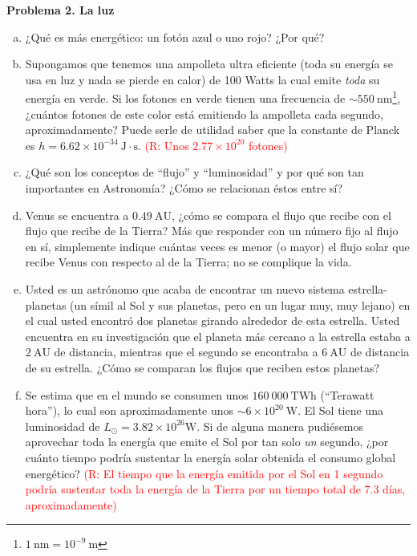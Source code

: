 \documentclass{article}
\begin{document}
\textbf{Problema 2. La luz}

\begin{enumerate} [a)]

\item ¿Qué es más energético: un fotón azul o uno rojo? ¿Por qué?

\item Supongamos que tenemos una ampolleta ultra eficiente (toda su energía se usa en luz y nada se pierde en calor) de 100 Watts la cual emite \emph{toda} su energía en verde. Si los fotones en verde tienen una frecuencia de $\sim 550 \ \text{nm}$\footnote{$1 \ \text{nm} = 10^{-9} \ \text{m}$}, ¿cuántos fotones de este color está emitiendo la ampolleta cada segundo, aproximadamente? Puede serle de utilidad saber que la constante de Planck es $h = 6.62 \times 10^{-34} \ \text{J} \cdot \text{s}$. 
\textcolor{red}{(R: Unos $2.77 \times 10^{20}$ fotones)}

\item ¿Qué son los conceptos de ``flujo'' y ``luminosidad'' y por qué son tan importantes en Astronomía? ¿Cómo se relacionan éstos entre sí?

\item Venus se encuentra a $0.49 \ \text{AU}$, ¿cómo se compara el flujo que recibe con el flujo que recibe de la Tierra? Más que responder con un número fijo al flujo en sí, simplemente indique cuántas veces es menor (o mayor) el flujo solar que recibe Venus con respecto al de la Tierra; no se complique la vida.

\newpage

\item Usted es un astrónomo que acaba de encontrar un nuevo sistema estrella-planetas (un símil al Sol y sus planetas, pero en un lugar muy, muy lejano) en el cual usted encontró dos planetas girando alrededor de esta estrella. Usted encuentra en su investigación que el planeta más cercano a la estrella estaba a $2 \ \text{AU}$ de distancia, mientras que el segundo se encontraba a $6 \ \text{AU}$ de distancia de su estrella. ¿Cómo se comparan los flujos que reciben estos planetas?

\item Se estima que en el mundo se consumen unos $160 \ 000 \ \text{TWh}$ (``Terawatt hora''), lo cual son aproximadamente unos $\sim 6 \times 10^{20} \ \text{W}$. El Sol tiene una luminosidad de $L_\odot = 3.82 \times 10^{26} \text{W}$. Si de alguna manera pudiésemos aprovechar toda la energía que emite el Sol por tan solo \emph{un} segundo, ¿por cuánto tiempo podría sustentar la energía solar obtenida el consumo global energético? \textcolor{red}{(R: El tiempo que la energía emitida por el Sol en 1 segundo podría sustentar toda la energía de la Tierra por un tiempo total de 7.3 días, aproximadamente)}
\end{enumerate}
\end{document}
